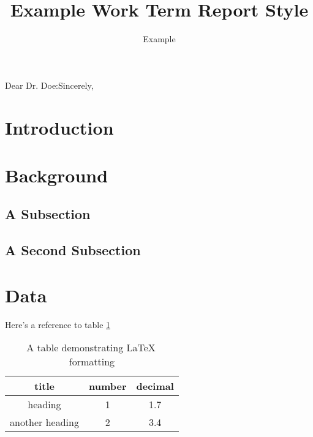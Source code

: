 \documentclass{workreport}
\title{
	Example Work Term Report Style
}
\author{Example}
\begin{document}
\maketitlepage

\begin{letter_of_submittal}{Dear Dr. Doe:}{Sincerely,}
	\lipsum[1]
	\lipsum[2]

\end{letter_of_submittal}

\toctree

\begin{contributions}
	\lipsum[1]
	\lipsum[2]
	\lipsum[3]
\end{contributions}

\begin{summary}
	\lipsum[1-6]
\end{summary}

\listoffiguresandtables

\begin{body}
\section{Introduction}

\lipsum[1-6]

\section{Background}

\lipsum[1-2]

	\subsection{A Subsection}
	
	\lipsum[1]
	
	\subsection{A Second Subsection}
	
	\lipsum[2]
	
\section{Data}

\lipsum[1-2]

Here's a reference to table \ref{tbl:exampletable}

\begin{table}
	\centering
	\begin{tabular}{|c|c|c|} \hline
		title & number & decimal \\ \hline
		heading & 1 & 1.7 \\ \hline
		another heading & 2 & 3.4 \\ \hline
	\end{tabular}
	\caption{A table demonstrating \LaTeX \, formatting}
	\label{tbl:exampletable}
\end{table}


\end{body}
\end{document}
